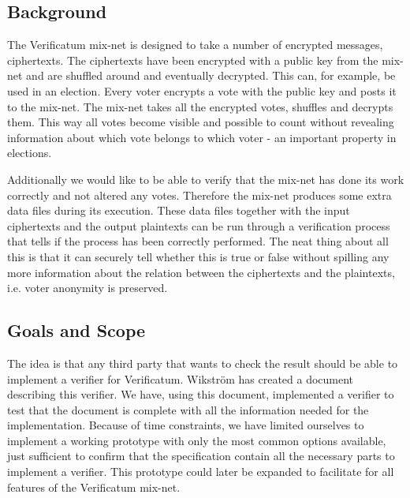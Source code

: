 \subsection{Background}

The Verificatum mix-net is designed to take a number of encrypted
messages, ciphertexts. The ciphertexts have been encrypted with a
public key from the mix-net and are shuffled around and eventually
decrypted. This can, for example, be used in an election. Every voter
encrypts a vote with the public key and posts it to the mix-net. The
mix-net takes all the encrypted votes, shuffles and decrypts
them. This way all votes become visible and possible to count without
revealing information about which vote belongs to which voter - 
an important property in elections.

Additionally we would like to be able to verify that the mix-net has
done its work correctly and not altered any votes. Therefore the
mix-net produces some extra data files during its execution. These
data files together with the input ciphertexts and the output
plaintexts can be run through a verification process that tells if the
process has been correctly performed. The neat thing about all this is
that it can securely tell whether this is true or false without
spilling any more information about the relation between the
ciphertexts and the plaintexts, i.e. voter anonymity is preserved.

\subsection{Goals and Scope}

The idea is that any third party that wants to check the result should
be able to implement a verifier for Verificatum. Wikström has
created a document describing this verifier.\cite{wikstrom1} We have, using this
document, implemented a verifier to test that the document is complete
with all the information needed for the implementation. Because of
time constraints, we have limited ourselves to implement a working
prototype with only the most common options available, just sufficient
to confirm that the specification contain all the necessary parts to
implement a verifier. This prototype could later be expanded to
facilitate for all features of the Verificatum mix-net.
